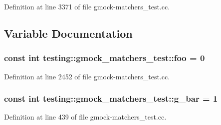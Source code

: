 Definition at line 3371 of file gmock-\/matchers\+\_\+test.\+cc.



\subsection{Variable Documentation}
\subsubsection[{\texorpdfstring{foo}{foo}}]{\setlength{\rightskip}{0pt plus 5cm}const int testing\+::gmock\+\_\+matchers\+\_\+test\+::foo = 0}\hypertarget{namespacetesting_1_1gmock__matchers__test_a3536e68112ffbb1f76887cd15bb45c15}{}\label{namespacetesting_1_1gmock__matchers__test_a3536e68112ffbb1f76887cd15bb45c15}


Definition at line 2452 of file gmock-\/matchers\+\_\+test.\+cc.

\subsubsection[{\texorpdfstring{g\+\_\+bar}{g_bar}}]{\setlength{\rightskip}{0pt plus 5cm}const int testing\+::gmock\+\_\+matchers\+\_\+test\+::g\+\_\+bar = 1}\hypertarget{namespacetesting_1_1gmock__matchers__test_a55dcc962203a3a3361d2e7e00ed99b4d}{}\label{namespacetesting_1_1gmock__matchers__test_a55dcc962203a3a3361d2e7e00ed99b4d}


Definition at line 439 of file gmock-\/matchers\+\_\+test.\+cc.

